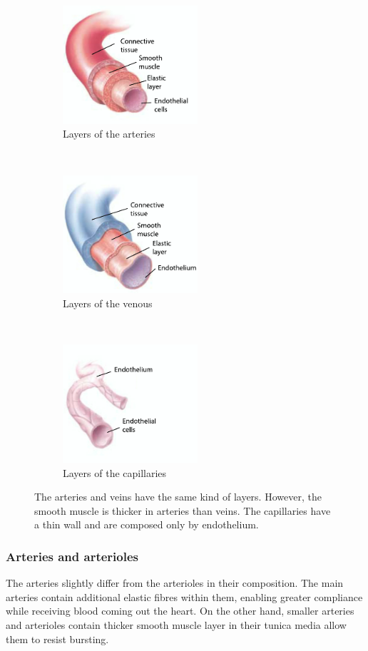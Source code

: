 \begin{figure}[!htbp]
	\centering
	\begin{subfigure}[t]{0.33\textwidth}
		\centering
		\includegraphics[width=5cm]{figure1a}
		\caption{Layers of the arteries}
		\label{fig:arteries composion}
	\end{subfigure}%
	~ 
	\begin{subfigure}[t]{0.33\textwidth}
		\centering
		\includegraphics[width=5cm]{figure1c}
		\caption{Layers of the venous}
		\label{fig:veins composition}
	\end{subfigure}
	~ 
	\begin{subfigure}[t]{0.33\textwidth}
		\centering
		\includegraphics[width=5cm, trim={0 0 2cm 0},clip]{figure1b}
		\caption{Layers of the capillaries}
		\label{fig:capillaries composition}
	\end{subfigure}
	\caption[Layers of the blood vessels]{The arteries and veins have the same kind of layers. However, the smooth muscle is thicker in arteries than veins. The capillaries have a thin wall and are composed only by endothelium.}
	\label{fig:vessels composition}
\end{figure}

\subsubsection{Arteries and arterioles}
The arteries slightly differ from the arterioles in their composition. The main arteries contain additional elastic fibres within them, enabling greater compliance while receiving blood coming out the heart. On the other hand, smaller arteries and arterioles contain thicker smooth muscle layer in their tunica media allow them to resist bursting.  

